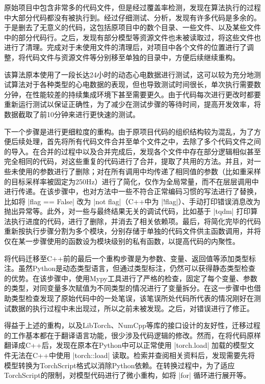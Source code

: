 原始项目中包含非常多的代码文件，但是经过覆盖率检测，发现在算法执行的过程中大部分代码都没有被执行到。经过仔细测试、分析，发现有许多代码是多余的。于是删去了无意义的代码，这包括原项目中的数个目录、一些文件、以及某些文件中的部分代码行。之后，发现有部分模型等资源文件也未被读取过，将这些文件也进行了清理。完成对于未使用文件的清理后，对项目中各个文件的位置进行了调整，将代码文件与资源文件等分别移至单独的目录中，方便后续继续重构。

该算法原本使用了一段长达24小时的动态心电数据进行测试，这可以较为充分地测试算法对于各种类型的心电数据的表现，但也导致测试时间很长，单次执行需要数分钟，在性能较差的持续集成环境下甚至需要更久。由于代码每次进行更改时都要重新运行测试以保证正确性，为了减少在测试步骤的等待时间，提高开发效率，将数据截取了前10分钟来进行更快速的测试。

下一个步骤是进行更细粒度的重构。由于原项目代码的组织结构较为混乱，为了方便后续处理，首先将所有代码文件合并至单个文件之中，去除了多个代码文件之间的导入。在合并的过程中以及合并完成后，发现各个文件中存在部分逻辑相似甚至完全相同的代码，对这些重复的代码进行了合并，提取了共用的方法。并且，对一些未使用的参数进行了删除；对在所有调用中均传递了相同值的参数（比如重采样的目标采样率被固定为250Hz）进行了简化，仅作为全局常量，而不在层层调用中进行传递。在该步骤中，也对方法中一些不符合正常编码习惯的写法进行了替换，比如将 |flag == False| 改为 |not flag|（C++中为 |!flag|）、手动打印错误消息改为抛出异常等。此外，对一些与最终结果无关的调试代码，比如基于 |tqdm| 打印算法执行进度的代码，进行了删除，并消去了相关依赖项。最后，将简化完毕的代码重新按执行步骤分割为多个模块，分别存储于单独的代码文件供主函数调用，并将仅在某一步骤使用的函数设为模块级别的私有函数，以提高代码的内聚性。

将代码迁移至C++前的最后一个重构步骤是为参数、变量、返回值等添加类型标注。虽然Python是动态类型语言，但通过类型标注，仍然可以获得静态类型检查的优势。在该步骤中，使用Mypy工具进行了严格的检查，固定了每个变量、参数的类型，对同变量多次赋值为不同类型的情况进行了变量拆分。在这一步骤中也借助类型检查发现了原始代码中的一处笔误，该笔误所处代码所代表的情况刚好在测试数据的执行过程中未出现过，所以之前未被发现。之后，对错误进行了修正。

得益于上述的重构，以及LibTorch、NumCpp等库的接口设计的友好性，迁移过程的工作基本都在于翻译语言功能，很少涉及代码逻辑的修改。然而，在将代码原样翻译成C++后，发现在原本在Python中可以正常使用 |torch.load| 加载的模型文件无法在C++中使用 |torch::load| 读取。检索并查阅相关资料后，发现需要先将模型转换为TorchScript格式以消除Python依赖。在转换过程中，为了适应TorchScript的限制，对模型代码进行了微小重构，如将 |for| 循环进行展开等。

